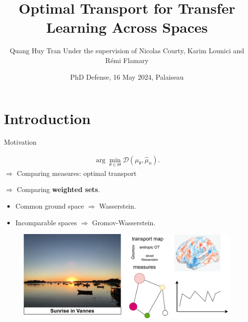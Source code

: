 \documentclass{beamer}
\title[PhD Defense]{Optimal Transport for Transfer Learning Across Spaces}
\author[]{Quang Huy Tran \break \scriptsize{Under the supervision of Nicolas Courty, Karim Lounici and Rémi Flamary}}
\institute[] %
{
  \inst{1}%
  Institut de Recherche en Informatique et Systèmes Aléatoires - IRISA \\
  Université Bretagne Sud
  \and
  \inst{2}%
  Centre de Mathématiques Appliquées - CMAP \\
  Ecole Polytechnique
}
\date[] %
{PhD Defense, 16 May 2024, Palaiseau}
\begin{document}
\frame{\titlepage}


\section{Introduction}
\begin{frame}{Motivation}
\scriptsize

\begin{minipage}[t]{0.6\linewidth}
  {\color{brown}{Density fitting:}}
  \vspace{-0.7cm}
  \begin{align*}
    \arg\min_{\theta \in \Theta} \mathcal D(\mu_{\theta}, \widehat{\mu}_n).
  \end{align*}
  $\Rightarrow$ Comparing measures: optimal transport

  $\Rightarrow$ Comparing \textbf{weighted sets}.

  \vspace{0.4cm}
  {\color{brown}{Folks say:}}
  \begin{itemize}
    \item Common ground space $\Rightarrow$ Wasserstein.
    \item Incomparable spaces $\Rightarrow$ Gromov-Wasserstein.
  \end{itemize}

  \end{minipage}%
  \hfill%
  \hspace{-6cm}
  \begin{minipage}[t]{0.49\linewidth}
    \vspace{-0.2cm}
  \begin{figure}
    \centering
    \includegraphics[width=1.15\linewidth, keepaspectratio=true]{OT_new/appli.pdf}
  \end{figure}
  \end{minipage}


\end{frame}
\end{document}
